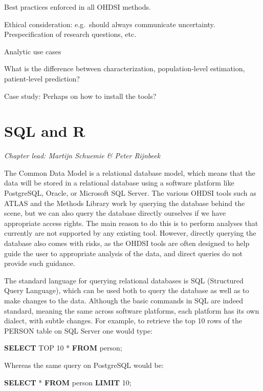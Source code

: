 \documentclass[]{book}
\newenvironment{Shaded}{\begin{snugshade}}{\end{snugshade}}
\newcommand{\KeywordTok}[1]{\textcolor[rgb]{0.13,0.29,0.53}{\textbf{#1}}}
\newcommand{\DecValTok}[1]{\textcolor[rgb]{0.00,0.00,0.81}{#1}}
\newcommand{\NormalTok}[1]{#1}
\begin{document}
Best practices enforced in all OHDSI methods.

Ethical consideration: e.g.~should always communicate uncertainty.
Prespecification of research questions, etc.

Analytic use cases

What is the difference between characterization, population-level
estimation, patient-level prediction?

Case study: Perhaps on how to install the tools?

\chapter{SQL and R}\label{SqlAndR}

\emph{Chapter lead: Martijn Schuemie \& Peter Rijnbeek}

The Common Data Model is a relational database model, which means that
the data will be stored in a relational database using a software
platform like PostgreSQL, Oracle, or Microsoft SQL Server. The various
OHDSI tools such as ATLAS and the Methods Library work by querying the
database behind the scene, but we can also query the database directly
ourselves if we have appropriate access rights. The main reason to do
this is to perform analyses that currently are not supported by any
existing tool. However, directly querying the database also comes with
risks, as the OHDSI tools are often designed to help guide the user to
appropriate analysis of the data, and direct queries do not provide such
guidance.

The standard language for querying relational databases is SQL
(Structured Query Language), which can be used both to query the
database as well as to make changes to the data. Although the basic
commands in SQL are indeed standard, meaning the same across software
platforms, each platform has its own dialect, with subtle changes. For
example, to retrieve the top 10 rows of the PERSON table on SQL Server
one would type:

\begin{Shaded}
\begin{Highlighting}[]
\KeywordTok{SELECT}\NormalTok{ TOP }\DecValTok{10}\NormalTok{ * }\KeywordTok{FROM}\NormalTok{ person;}
\end{Highlighting}
\end{Shaded}

Whereas the same query on PostgreSQL would be:

\begin{Shaded}
\begin{Highlighting}[]
\KeywordTok{SELECT}\NormalTok{ * }\KeywordTok{FROM}\NormalTok{ person }\KeywordTok{LIMIT} \DecValTok{10}\NormalTok{;}
\end{Highlighting}
\end{Shaded}
\end{document}

